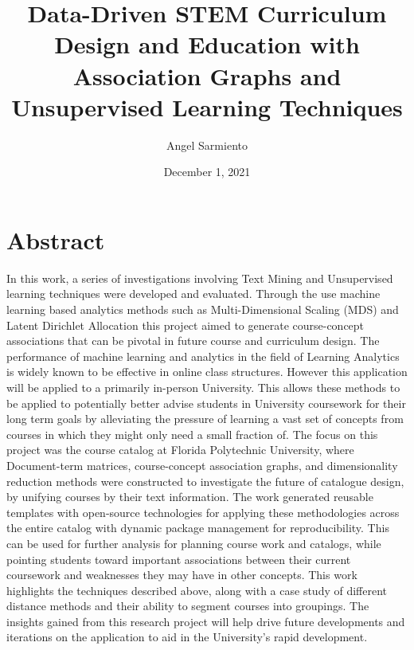 \documentclass[11pt]{report}
\begin{document}
\title{Data-Driven STEM Curriculum Design and Education with Association Graphs and Unsupervised Learning Techniques}
\author{Angel Sarmiento}
\date{December 1, 2021}
\maketitle

\section{Abstract}

\indent In this work,  a series of investigations involving Text Mining and Unsupervised learning techniques were developed and evaluated.  Through the use machine learning based analytics methods such as Multi-Dimensional Scaling (MDS) and Latent Dirichlet Allocation this project aimed to generate course-concept associations that can be pivotal in future course and curriculum design. The performance of machine learning and analytics in the field of Learning Analytics is widely known to be effective in online class structures. However this application will be applied to a primarily in-person University. This allows these methods to be applied to potentially better advise students in University coursework for their long term goals by alleviating the pressure of learning a vast set of concepts from courses in which they might only need a small fraction of. The focus on this project was the course catalog at Florida Polytechnic University, where Document-term matrices, course-concept association graphs, and dimensionality reduction methods were constructed to investigate the future of catalogue design,  by unifying courses by their text information.  The work generated reusable templates with open-source technologies for applying these methodologies across the entire catalog with dynamic package management for reproducibility. This can be used for further analysis for planning course work and catalogs, while pointing students toward important associations between their current coursework and weaknesses they may have in other concepts.  This work highlights the techniques described above, along with a case study of different distance methods and their ability to segment courses into groupings.  The insights gained from this research project will help drive future developments and iterations on the application to aid in the University's rapid development. 
\end{document}
